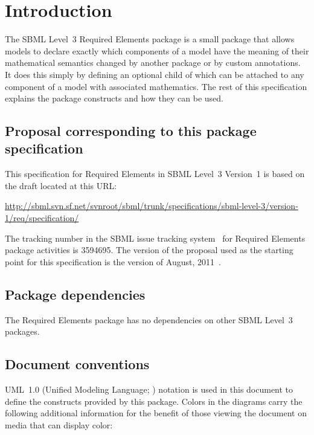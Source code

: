 
\section{Introduction}
\label{intro}

The SBML Level~3 Required Elements package is a small package that allows models to declare exactly which components of a model have the meaning of their mathematical semantics changed by another package or by custom annotations.  It does this simply by defining an optional child of \SBase which can be attached to any component of a model with associated mathematics.  The rest of this specification explains the package constructs and how they can be used.


\subsection{Proposal corresponding to this package specification}

This specification for Required Elements in SBML Level~3 Version~1 is based on the draft located at this URL:

\begin{center}
  \vspace*{1ex}\small
  \url{http://sbml.svn.sf.net/svnroot/sbml/trunk/specifications/sbml-level-3/version-1/req/specification/}
  \vspace*{1ex}
\end{center}

The tracking number in the SBML issue tracking system~\citep{tracker} for Required Elements package activities is 3594695.  The version of the proposal used as the starting point for this specification is the version of August, 2011~\citep{req_proposal_2011}.


\subsection{Package dependencies}

The Required Elements package has no dependencies on other SBML Level~3 packages.


\subsection{Document conventions}
\label{conventions}

UML~1.0 (Unified Modeling Language; \citealt{eriksson:1998, oestereich:1999}) notation is used in this document to define the constructs provided by this package.  Colors in the diagrams carry the following additional information for the benefit of those viewing the document on media that can display color:

